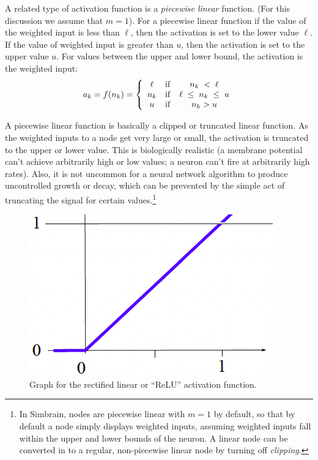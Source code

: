 A related type of activation function is a \emph{piecewise linear} function. (For this discussion we assume that $m=1$). For a piecewise linear function if the value of the weighted input is less than $\ell$, then the activation is set to the lower value $\ell$. If the value of weighted input is greater than $u$, then the activation is set to the upper value $u$. For values between the upper and lower bound, the activation is the weighted input:
\begin{eqnarray*}
a_k = f(n_k) =  
\left\{
      \begin{array}{clc}
                  \ell      & {\rm if} &   n_k\; < \; \ell             \\
              n_k  & {\rm if} &  \ell \;\leq\; n_k \;\leq\; u \\
               u     & {\rm if} &    n_k > u
      \end{array} 
\right.
\end{eqnarray*}

A piecewise linear function is basically a clipped or truncated linear function. As the weighted inputs to a node get very large or small, the activation is truncated to the upper or lower value. This is biologically realistic (a membrane potential can't achieve arbitrarily high or low values; a neuron can't fire at arbitrarily high rates). Also, it is not uncommon for a neural network algorithm to produce uncontrolled growth or decay, which can be prevented by the simple act of truncating the signal for certain values.\footnote{In Simbrain, nodes are piecewise linear with $m=1$ by default, so that by default a node simply displays weighted inputs, assuming weighted inputs fall within the upper and lower bounds of the neuron. A linear node can be converted in to a regular, non-piecewise linear node by turning off  \emph{clipping}.}

\begin{figure}[h]
\centering
\includegraphics[scale=.4]{./images/relu.png}
\caption[Scott Hotton.]{Graph for the rectified linear or ``ReLU'' activation function.}
\label{relu}
\end{figure}

